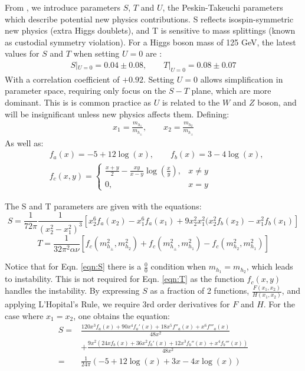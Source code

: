 \documentclass[12pt]{article}
\begin{document}
From \cite{gfitter2018}, we introduce parameters $S$, $T$ and $U$, the Peskin-Takeuchi parameters \cite{PeskinTakeuchi1990} which describe potential new physics contributions. S reflects isospin-symmetric new physics (extra Higgs doublets), and T is sensitive to mass splittings (known as custodial symmetry violation). For a Higgs boson mass of 125 GeV, the latest values for $S$ and $T$ when setting $U = 0$ are \cite{gfitter2018}:
 \begin{align}
     S|_{U=0} = 0.04 \pm0.08, \qquad
     T|_{U=0} = 0.08\pm0.07
 \end{align}
With a correlation coefficient of $+0.92$. Setting $U = 0$ allows simplification in parameter space, requiring only focus on the $S-T$ plane, which are more dominant. This is is common practice as $U$ is related to the $W$ and $Z$ boson, and will be insignificant unless new physics affects them. Defining:
\begin{align}
    x_1 = \frac{m_{h_1}}{m_{h_\pm}}, \qquad 
    x_2 = \frac{m_{h_2}}{m_{h_\pm}}
\end{align}
As well as:
\begin{align}
    &f_a(x) = -5 +12\log(x), \qquad f_b(x) = 3-4\log(x),
    \\
    &f_c(x,y) = 
    \begin{cases}
        \frac{x+y}{2}-\frac{xy}{x-y}\log{\left(\frac{x}{y}\right)}, & x\neq y\\
        0, & x = y
    \end{cases}
\end{align}

The S and T parameters are given \cite{Belyaev:2016lok} with the equations:
\begin{equation}
           S = \frac{1}{72\pi}\frac{1}{(x^2_2 - x^2_1)^3}[x^6_2f_a(x_2)-x^6_1f_a(x_1)+ 9x_2^2x_1^2(x_2^2f_b(x_2)-x^2_1f_b(x_1)] 
    \label{eqn:S}
\end{equation}
\begin{equation}
        T = \frac{1}{32\pi^2\alpha\nu}[f_c(m^2_{h_\pm},m^2_{h_2})
            + f_c(m^2_{h_\pm},m^2_{h_1}) - f_c(m^2_{h_2},m^2_{h_1})]
    \label{eqn:T}
\end{equation}

Notice that for Eqn. \ref{eqn:S} there is a $\frac{0}{0}$ condition when $m_{h_1} = m_{h_2}$, which leads to instability. This is not required for Eqn. \ref{eqn:T} as the function $f_c(x, y)$ handles the instability. By expressing $S$ as a fraction of 2 functions, $\frac{F(x_1, x_2)}{H(x_1, x_2)}$, and applying L'Hopital's Rule, we require 3rd order derivatives for $F$ and $H$. For the case where $x_1 = x_2$, one obtains the equation:
\begin{equation}
    \begin{split}
        S =& \frac{120 x^3f_a(x) + 90 x^4f_a'(x)+18x^5f''_a(x)+x^6f'''_a(x)}{48x^2} \\&+\frac{9x^2\left(24xf_b(x) + 36x^2f_b'(x)+12x^3f_b''(x) + x^4f_b'''(x)\right)}{48x^2}
        \\ =& \frac{1}{24\pi}\left(-5 + 12\log(x) + 3x - 4x\log(x)\right)
    \end{split}
    \label{eqn:S_hopital}
\end{equation}
\end{document}
